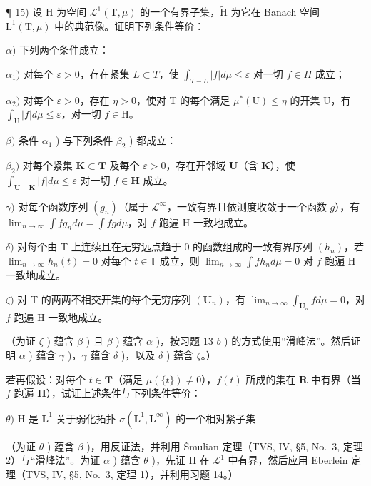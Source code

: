 ¶ 15) 设 H 为空间 \(\mathcal{L}^1 (\mathrm{T},\mu)\) 的一个有界子集，\(\widetilde{\mathrm{H}}\) 为它在 Banach 空间 \(\mathrm{L}^1 (\mathrm{T},\mu)\) 中的典范像。证明下列条件等价：

\(\alpha)\) 下列两个条件成立：

\(\alpha_{1})\) 对每个 \(\varepsilon > 0\)，存在紧集 \(L \subset T\)，使 \(\int_{T - L} |f| d\mu \leqslant \varepsilon\) 对一切 \(f \in H\) 成立；

\(\alpha_{2})\) 对每个 \(\varepsilon > 0\)，存在 \(\eta > 0\)，使对 T 的每个满足 \(\mu^{*}(\mathrm{U}) \leqslant \eta\) 的开集 U，有 \(\int_{\mathrm{U}} |f| d\mu \leqslant \varepsilon\)，对一切 \(f \in \mathrm{H}\)。

\(\beta)\) 条件 \(\alpha_{1}\) ) 与下列条件 \(\beta_{2}\) ) 都成立：

\(\beta_{2})\) 对每个紧集 \(\mathbf{K} \subset \mathbf{T}\) 及每个 \(\varepsilon > 0\)，存在开邻域 \(\mathbf{U}\)（含 \(\mathbf{K}\)），使 \(\int_{\mathbf{U} - \mathbf{K}} |f| d\mu \leqslant \varepsilon\) 对一切 \(f \in \mathbf{H}\) 成立。

\(\gamma)\) 对每个函数序列 \((g_n)\)（属于 \(\mathcal{L}^{\infty}\)，一致有界且依测度收敛于一个函数 \(g\)），有 \(\lim_{n\to \infty}\int fg_n d\mu = \int fg d\mu\)，对 \(f\) 跑遍 H 一致地成立。

\(\delta)\) 对每个由 T 上连续且在无穷远点趋于 0 的函数组成的一致有界序列 \((h_n)\)，若 \(\lim_{n\to \infty}h_n(t) = 0\) 对每个 \(t\in \mathbb{T}\) 成立，则 \(\lim_{n\to \infty}\int fh_n d\mu = 0\) 对 \(f\) 跑遍 H 一致地成立。

\(\zeta)\) 对 T 的两两不相交开集的每个无穷序列 \((\mathbf{U}_n)\)，有 \(\lim_{n\to \infty}\int_{\mathbf{U}_n}f d\mu = 0\)，对 \(f\) 跑遍 H 一致地成立。

（为证 \(\zeta\) ) 蕴含 \(\beta\) ) 且 \(\beta\) ) 蕴含 \(\alpha\) )，按习题 13 \(b\) ) 的方式使用“滑峰法”。然后证明 \(\alpha\) ) 蕴含 \(\gamma\) )，\(\gamma\) 蕴含 \(\delta\) )，以及 \(\delta\) ) 蕴含 \(\zeta\)。）

若再假设：对每个 \(t \in \mathbf{T}\)（满足 \(\mu(\{t\}) \neq 0\)），\(f(t)\) 所成的集在 \(\mathbf{R}\) 中有界（当 \(f\) 跑遍 \(\mathbf{H}\)），试证上述条件与下列条件等价：

\(\theta)\) H 是 \(\mathbf{L}^1\) 关于弱化拓扑 \(\sigma (\mathbf{L}^{1},\mathbf{L}^{\infty})\) 的一个相对紧子集

（为证 \(\theta\) ) 蕴含 \(\beta\) )，用反证法，并利用 Šmulian 定理（TVS, IV, §5, No.~3, 定理 2）与“滑峰法”。为证 \(\alpha\) ) 蕴含 \(\theta\) )，先证 H 在 \(\mathcal{L}^1\) 中有界，然后应用 Eberlein 定理（TVS, IV, §5, No.~3, 定理 1），并利用习题 14。）

